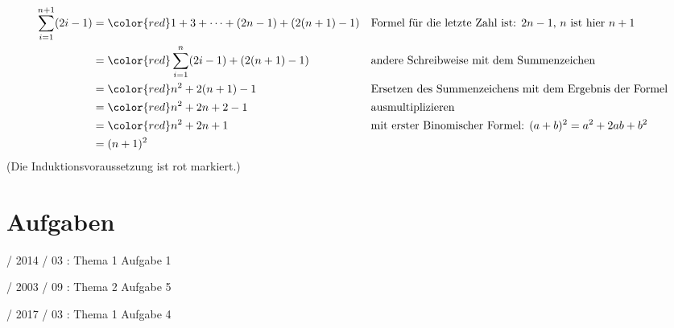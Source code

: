 \documentclass{lehramt-informatik}
\begin{document}
{\footnotesize
\begin{align*}
\sum^{n+1}_{i=1} (2i-1)
  &= {\color{red}1 + 3 + \cdots + (2n - 1)} + (2(n+1)-1) && \text{Formel für die letzte Zahl ist: } 2n - 1 \text{, } n \text{ ist hier } n + 1\\
  &= {\color{red} \sum^n_{i=1} (2i-1)} + (2(n+1)-1) && \text{andere Schreibweise mit dem Summenzeichen}\\
  &= {\color{red} n^2} + 2(n + 1) - 1 && \text{Ersetzen des Summenzeichens mit dem Ergebnis der Formel}\\
  &= {\color{red} n^2} + 2n + 2 - 1 && \text{ausmultiplizieren}\\
  &= {\color{red} n^2} + 2n + 1 && \text{mit erster Binomischer Formel: } (a+b)^{2}=a^{2}+2ab+b^{2} \\
  &= (n+1)^2
\end{align*}
}
(Die Induktionsvoraussetzung ist rot markiert.)


\chapter{Aufgaben}

%

 / 2014 / 03 : Thema 1 Aufgabe 1

%

 / 2003 / 09 : Thema 2 Aufgabe 5

%

 / 2017 / 03 : Thema 1 Aufgabe 4

\literatur
\end{document}
